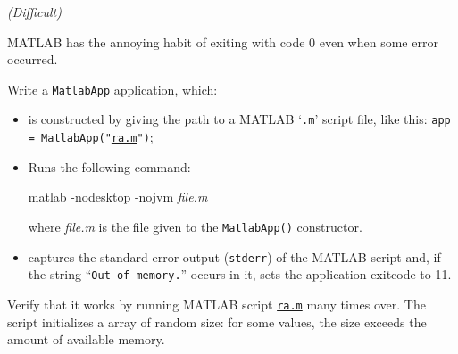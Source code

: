\documentclass[english,serif,mathserif,xcolor=pdftex,dvipsnames,table]{beamer}
\begin{document}
\begin{frame}[fragile]
  \begin{exercise*}[6.C] \emph{(Difficult)} \small

    MATLAB has the annoying habit of exiting with code 0 even when some error occurred.

    \+
    Write a \texttt{MatlabApp} application, which:
    \begin{itemize}
    \item is constructed by giving the path to a MATLAB `\texttt{.m}'
      script file, like this: \texttt{app = MatlabApp("\href{https://github.com/uzh/gc3pie/blob/master/docs/programmers/tutorials/workflows/downloads/ra.m}{ra.m}")};
    \item Runs the following command:
\begin{semiverbatim}
matlab -nodesktop -nojvm \emph{file.m}
\end{semiverbatim}
      where \emph{file.m} is the file given to the
      \texttt{MatlabApp()} constructor.
    \item captures the standard error output (\texttt{stderr}) of the
      MATLAB script and, if the string ``\texttt{Out of memory.}''
      occurs in it, sets the application exitcode to 11.
    \end{itemize}

    Verify that it works by running MATLAB script
    \href{https://github.com/uzh/gc3pie/blob/master/docs/programmers/tutorials/workflows/downloads/ra.m}{\texttt{ra.m}}
    many times over.  The script initializes a array of random size:
    for some values, the size exceeds the amount of available memory.
  \end{exercise*}
\end{frame}




\end{document}
